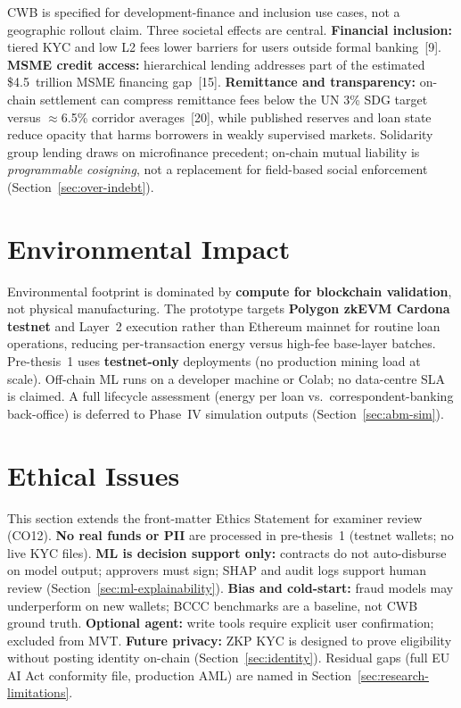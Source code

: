 \documentclass[12pt, a4paper]{report}
\begin{document}
CWB is specified for development-finance and inclusion use cases, not a geographic rollout claim. Three societal effects are central. \textbf{Financial inclusion:} tiered KYC and low L2 fees lower barriers for users outside formal banking~[9]. \textbf{MSME credit access:} hierarchical lending addresses part of the estimated \$4.5~trillion MSME financing gap~[15]. \textbf{Remittance and transparency:} on-chain settlement can compress remittance fees below the UN 3\% SDG target versus $\approx$6.5\% corridor averages~[20], while published reserves and loan state reduce opacity that harms borrowers in weakly supervised markets. Solidarity group lending draws on microfinance precedent; on-chain mutual liability is \textit{programmable cosigning}, not a replacement for field-based social enforcement (Section~\ref{sec:over-indebt}).

\section{Environmental Impact}
\label{sec:environmental-impact}

Environmental footprint is dominated by \textbf{compute for blockchain validation}, not physical manufacturing. The prototype targets \textbf{Polygon zkEVM Cardona testnet} and Layer~2 execution rather than Ethereum mainnet for routine loan operations, reducing per-transaction energy versus high-fee base-layer batches. Pre-thesis~1 uses \textbf{testnet-only} deployments (no production mining load at scale). Off-chain ML runs on a developer machine or Colab; no data-centre SLA is claimed. A full lifecycle assessment (energy per loan vs.\ correspondent-banking back-office) is deferred to Phase~IV simulation outputs (Section~\ref{sec:abm-sim}).

\section{Ethical Issues}
\label{sec:ethical-issues-ch3}

This section extends the front-matter Ethics Statement for examiner review (CO12). \textbf{No real funds or PII} are processed in pre-thesis~1 (testnet wallets; no live KYC files). \textbf{ML is decision support only:} contracts do not auto-disburse on model output; approvers must sign; SHAP and audit logs support human review (Section~\ref{sec:ml-explainability}). \textbf{Bias and cold-start:} fraud models may underperform on new wallets; BCCC benchmarks are a baseline, not CWB ground truth. \textbf{Optional agent:} write tools require explicit user confirmation; excluded from MVT. \textbf{Future privacy:} ZKP KYC is designed to prove eligibility without posting identity on-chain (Section~\ref{sec:identity}). Residual gaps (full EU AI Act conformity file, production AML) are named in Section~\ref{sec:research-limitations}.
\end{document}
